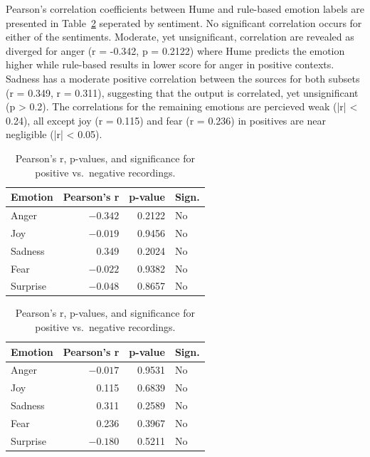 Pearson's correlation coefficients between Hume and rule-based emotion labels are presented in Table~\ref{tab:rq1_corr_pos_neg_side_by_side} seperated by sentiment. 
No significant correlation occurs for either of the sentiments. Moderate, yet unsignificant, correlation are revealed as diverged for anger (r = -0.342, p = 0.2122) where Hume predicts the emotion 
higher while rule-based results in lower score for anger in positive contexts. Sadness has a moderate positive correlation between the sources for both subsets (r = 0.349, r = 0.311), suggesting that the output is correlated, yet unsignificant (p > 0.2). 
The correlations for the remaining emotions are percieved weak (|r| < 0.24), all except joy (r = 0.115) and fear (r = 0.236) in positives are near negligible (|r| < 0.05).  
  \begin{table}[H]
    \centering
    \begin{subtable}{0.45\textwidth}
      \centering
      \caption*{\textbf{Positive Recordings}}
      \begin{tabular}{lrrl}
        \toprule
        \textbf{Emotion} & \textbf{Pearson’s r} & \textbf{p-value} & \textbf{Sign.} \\
        \midrule
        Anger    & $-0.342$ & 0.2122 & No \\
        Joy      & $-0.019$ & 0.9456 & No \\
        Sadness  & \phantom{$-$}0.349 & 0.2024 & No \\
        Fear     & $-0.022$ & 0.9382 & No \\
        Surprise & $-0.048$ & 0.8657 & No \\
        \bottomrule
      \end{tabular}
      \label{tab:rq1_corr_pos}
    \end{subtable}\hfill
    \begin{subtable}{0.45\textwidth}
      \centering
      \caption*{\textbf{Negative Recordings}}
      \begin{tabular}{lrrl}
        \toprule
        \textbf{Emotion} & \textbf{Pearson’s r} & \textbf{p-value} & \textbf{Sign.} \\
        \midrule
        Anger    & $-0.017$ & 0.9531 & No \\
        Joy      &  \phantom{$-$}0.115 & 0.6839 & No \\
        Sadness  &  \phantom{$-$}0.311 & 0.2589 & No \\
        Fear     &  \phantom{$-$}0.236 & 0.3967 & No \\
        Surprise & $-0.180$ & 0.5211 & No \\
        \bottomrule
      \end{tabular}
      \label{tab:rq1_corr_neg}
    \end{subtable}
    \caption{Pearson’s r, p-values, and significance for positive vs.\ negative recordings.}
    \label{tab:rq1_corr_pos_neg_side_by_side}
  \end{table}
  
